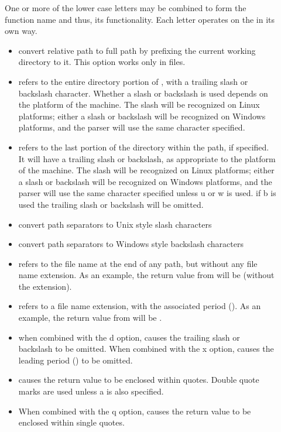 \begin{description}
\item []
One or more of the lower case letters may be combined to form the
function name and thus, its functionality.
Each letter operates on the  in its own way.
\begin{itemize}
  \item {} convert relative path to full path by prefixing the current working directory to it.
This option works only in  files.
  \item {} refers to the entire directory portion of ,
with a trailing slash or backslash character.
Whether a slash or backslash is used depends on the platform of
the machine.
The slash will be recognized on Linux platforms;
either a slash or backslash will be recognized on Windows platforms,
and the parser will use the same character specified.
  \item {} refers to the last portion of the directory within the path,
if specified.
It will have a trailing slash or backslash, 
as appropriate to the platform of the machine.
The slash will be recognized on Linux platforms;
either a slash or backslash will be recognized on Windows platforms,
and the parser will use the same character specified unless u or w is used.
if b is used the trailing slash or backslash will be omitted.
  \item {} convert path separators to Unix style slash characters
  \item {} convert path separators to Windows style backslash characters
  \item {} refers to the file name at the end of any path,
but without any file name extension.
As an  example, the return value from 
will be  (without the  extension).
  \item {} refers to a file name extension, with the associated
period ().
As an  example, the return value from 
will be .
  \item {} when combined with the d option, causes the trailing slash or backslash to
be omitted. When combined with the x option, causes the leading period () to be omitted.
  \item {} causes the return value to be enclosed within quotes. Double
quote marks are used unless a is also specified.
  \item {} When combined with the q option, causes the return value to be enclosed within single quotes.
\end{itemize}


\end{description}

